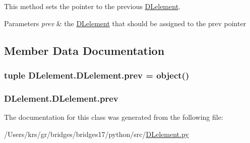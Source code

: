 This method sets the pointer to the previous \hyperlink{class_d_lelement_1_1_d_lelement}{D\+Lelement}. 


\begin{DoxyParams}{Parameters}
{\em prev} & the \hyperlink{class_d_lelement_1_1_d_lelement}{D\+Lelement} that should be assigned to the prev pointer \\
\hline
\end{DoxyParams}


\subsection{Member Data Documentation}
\hypertarget{class_d_lelement_1_1_d_lelement_afc081f21482fb230610ba211d07abe18}{}
\subsubsection[{prev}]{\setlength{\rightskip}{0pt plus 5cm}tuple D\+Lelement.\+D\+Lelement.\+prev = object()\hspace{0.3cm}{\ttfamily [static]}}\label{class_d_lelement_1_1_d_lelement_afc081f21482fb230610ba211d07abe18}
\hypertarget{class_d_lelement_1_1_d_lelement_a14bf836d9e64de3f407da9bb7ba93622}{}
\subsubsection[{prev}]{\setlength{\rightskip}{0pt plus 5cm}D\+Lelement.\+D\+Lelement.\+prev}\label{class_d_lelement_1_1_d_lelement_a14bf836d9e64de3f407da9bb7ba93622}


The documentation for this class was generated from the following file\+:\begin{DoxyCompactItemize}
\item 
/\+Users/krs/gr/bridges/bridges17/python/src/\hyperlink{_d_lelement_8py}{D\+Lelement.\+py}\end{DoxyCompactItemize}
